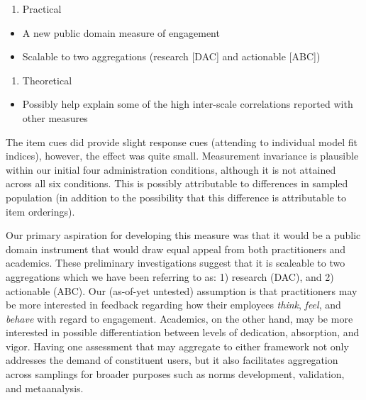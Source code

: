 \documentclass[
  man]{apa7}
\providecommand{\tightlist}{%
  \setlength{\itemsep}{0pt}\setlength{\parskip}{0pt}}
\begin{document}
\begin{enumerate}
\def\labelenumi{\arabic{enumi}.}
\setcounter{enumi}{1}
\tightlist
\item
  Practical
\end{enumerate}

\begin{itemize}
\tightlist
\item
  A new public domain measure of engagement
\item
  Scalable to two aggregations (research {[}DAC{]} and actionable {[}ABC{]})
\end{itemize}

\begin{enumerate}
\def\labelenumi{\arabic{enumi}.}
\setcounter{enumi}{2}
\tightlist
\item
  Theoretical
\end{enumerate}

\begin{itemize}
\tightlist
\item
  Possibly help explain some of the high inter-scale correlations reported with other measures
\end{itemize}

The item cues did provide slight response cues (attending to individual model fit indices), however, the effect was quite small. Measurement invariance is plausible within our initial four administration conditions, although it is not attained across all six conditions. This is possibly attributable to differences in sampled population (in addition to the possibility that this difference is attributable to item orderings).

Our primary aspiration for developing this measure was that it would be a public domain instrument that would draw equal appeal from both practitioners and academics. These preliminary investigations suggest that it is scaleable to two aggregations which we have been referring to as: 1) research (DAC), and 2) actionable (ABC). Our (as-of-yet untested) assumption is that practitioners may be more interested in feedback regarding how their employees \emph{think}, \emph{feel}, and \emph{behave} with regard to engagement. Academics, on the other hand, may be more interested in possible differentiation between levels of dedication, absorption, and vigor. Having one assessment that may aggregate to either framework not only addresses the demand of constituent users, but it also facilitates aggregation across samplings for broader purposes such as norms development, validation, and metaanalysis.
\end{document}

